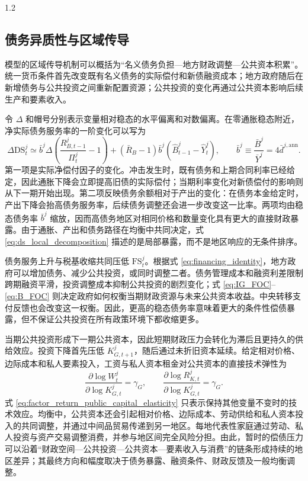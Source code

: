 \documentclass[12pt,UTF8]{ctexart}
\newcommand{\DS}{\mathrm{DS}}
\newcommand{\FS}{\mathrm{FS}}
\begin{document}
\begin{spacing}{1.2}
		\subsection{债务异质性与区域传导}
		
		模型的区域传导机制可以概括为“名义债务负担---地方财政调整---公共资本积累”。统一货币条件首先改变既有名义债务的实际偿付和新债融资成本；地方政府随后在新增债务与公共投资之间重新配置资源；公共投资的变化再通过公共资本影响后续生产和要素收入。
		
		令 $\Delta$ 和帽号分别表示变量相对稳态的水平偏离和对数偏离。在零通胀稳态附近，净实际债务服务率的一阶变化可以写为
		\begin{equation}
			\Delta \DS_t^j
			\simeq
			\bar b^j\Delta\left(\frac{R_{B,t-1}^j}{\Pi_t^j}-1\right)
			+
			(\bar R_B-1)\bar b^j\left(\widehat B_{t-1}^j-\widehat Y_t^j\right),
			\qquad
			\bar b^j\equiv\frac{\bar B^j}{\bar Y^j}=4\bar d^{j,\mathrm{ann}}.
			\label{eq:ds_local_decomposition}
		\end{equation}
		第一项是实际净偿付因子的变化。冲击发生时，既有债务和上期合同利率已经给定，因此通胀下降会立即提高旧债的实际偿付；当期利率变化对新债偿付的影响则从下一期开始出现。第二项反映债务余额相对于产出的变化：在债务本金给定时，产出下降会抬高债务服务率，后续债务调整还会进一步改变这一比率。两项均由稳态债务率 $\bar b^j$ 缩放，因而高债务地区对相同价格和数量变化具有更大的直接财政暴露。由于通胀、产出和债务路径在均衡中共同决定，式 \eqref{eq:ds_local_decomposition} 描述的是局部暴露，而不是地区响应的无条件排序。
		
		债务服务上升与税基收缩共同压低 $\FS_t^j$。根据式 \eqref{eq:financing_identity}，地方政府可以增加债务、减少公共投资，或同时调整二者。债务管理成本和融资利差限制跨期融资平滑，投资调整成本抑制公共投资的剧烈变化；式 \eqref{eq:IG_FOC}--\eqref{eq:B_FOC} 则决定政府如何权衡当期财政资源与未来公共资本收益。中央转移支付反馈也会改变这一权衡。因此，更高的稳态债务率意味着更大的条件性偿债暴露，但不保证公共投资在所有政策环境下都收缩更多。
		
		当期公共投资形成下一期公共资本，因此短期财政压力会转化为滞后且更持久的供给效应。投资下降首先压低 $K_{G,t+1}^j$，随后通过未折旧资本延续。给定相对价格、边际成本和私人要素投入，工资与私人资本租金对公共资本的直接技术弹性为
		\begin{equation}
			\frac{\partial \log W_t^j}{\partial \log K_{G,t}^j}=\gamma_G,
			\qquad
			\frac{\partial \log R_{K,t}^j}{\partial \log K_{G,t}^j}=\gamma_G.
			\label{eq:factor_return_public_capital_elasticity}
		\end{equation}
		式 \eqref{eq:factor_return_public_capital_elasticity} 只表示保持其他变量不变时的技术效应。均衡中，公共资本还会引起相对价格、边际成本、劳动供给和私人资本投入的共同调整，并通过中间品贸易传递到另一地区。每地代表性家庭通过劳动、私人投资与资产交易调整消费，并参与地区间完全风险分担。由此，暂时的偿债压力可以沿着“财政空间---公共投资---公共资本---要素收入与消费”的链条形成持续的地区差异；其最终方向和幅度取决于债务暴露、融资条件、财政反馈及一般均衡调整。
		

\end{spacing}
\end{document}
